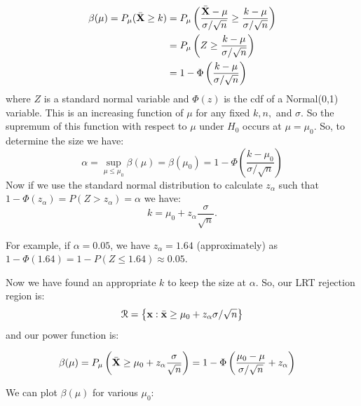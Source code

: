 \documentclass[11pt,]{article}
\def\bx{{\bf x}}
\def\bX{{\bf X}}
\def\bxbar{\bar{ \bx}}
\def\bXbar{\bar{ \bX}}
\def\Rsc{{\cal R}}
\def\bxbar{\bar{\bx}}
\begin{document}
\begin{align*}
 \beta(\mu) = P_\mu(\bXbar\geq k) &= P_\mu \left(\frac{\bXbar - \mu}{\sigma/\sqrt{n}} \geq \frac{k - \mu}{\sigma/\sqrt{n}}\right)\\
&=P_\mu \left(Z \geq \frac{k - \mu}{\sigma/\sqrt{n}}\right)\\
&= 1 - \Phi\left(\frac{k - \mu}{\sigma/\sqrt{n}} \right)
\end{align*} where \(Z\) is a standard normal variable and \(\Phi(z)\)
is the cdf of a Normal(0,1) variable. This is an increasing function of
\(\mu\) for any fixed \(k, n,\) and \(\sigma\). So the supremum of this
function with respect to \(\mu\) under \(H_0\) occurs at
\(\mu = \mu_0\). So, to determine the size we have:
\[\alpha =  \sup_{\mu \leq \mu_0}\beta(\mu) = \beta(\mu_0) = 1 - \Phi\left(\frac{k - \mu_0}{\sigma/\sqrt{n}} \right)\]
Now if we use the standard normal distribution to calculate \(z_\alpha\)
such that \(1-\Phi(z_\alpha) = P(Z > z_\alpha) = \alpha\) we have:
\[k = \mu_0 + z_\alpha\frac{\sigma}{\sqrt{n}}.\]

For example, if \(\alpha = 0.05\), we have \(z_\alpha = 1.64\)
(approximately) as \(1-\Phi(1.64) = 1 - P(Z\leq 1.64) \approx 0.05\).

Now we have found an appropriate \(k\) to keep the size at \(\alpha\).
So, our LRT rejection region is:
\[\Rsc = \left\{\bx: \bxbar \geq \mu_0 + z_\alpha\sigma/\sqrt{n}\right\}\]
and our power function is:

\begin{align*}
\beta(\mu) &= P_\mu\left(\bXbar\geq \mu_0 + z_\alpha\frac{\sigma}{\sqrt{n}}\right) = 1 - \Phi\left(\frac{\mu_0 - \mu}{\sigma/\sqrt{n}} + z_\alpha\right)
\end{align*}

We can plot \(\beta(\mu)\) for various \(\mu_0\):
\end{document}
